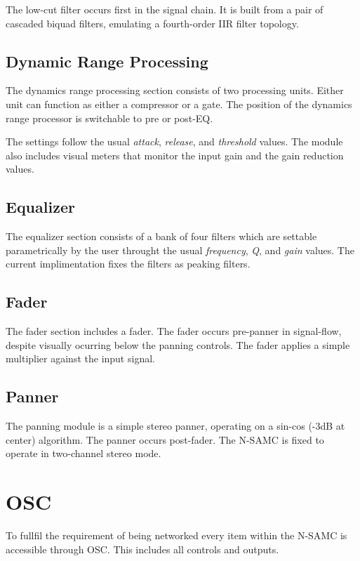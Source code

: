 \documentclass[letterpaper, 12pt, twosided, twocolumn]{article}
\begin{document}
The low-cut filter occurs first in the signal chain. It is built from a pair of cascaded biquad filters, emulating a fourth-order IIR filter topology.

\subsection{Dynamic Range Processing}

The dynamics range processing section consists of two processing units. Either unit can function as either a compressor or a gate. The position of the dynamics range processor is switchable to pre or post-EQ.

The settings follow the usual \emph{attack}, \emph{release}, and \emph{threshold} values. The module also includes visual meters that monitor the input gain and the gain reduction values.

\subsection{Equalizer}

The equalizer section consists of a bank of four filters which are settable parametrically by the user throught the usual \emph{frequency}, \emph{Q}, and \emph{gain} values. The current implimentation fixes the filters as peaking filters.

\subsection{Fader}

The fader section includes a fader. The fader occurs pre-panner in signal-flow, despite visually ocurring below the panning controls. The fader applies a simple multiplier against the input signal.

\subsection{Panner}

The panning module is a simple stereo panner, operating on a sin-cos (-3dB at center) algorithm. The panner occurs post-fader. The N-SAMC is fixed to operate in two-channel stereo mode.

\section{OSC}

To fullfil the requirement of being networked every item within the N-SAMC is accessible through OSC. This includes all controls and outputs.
\end{document}
